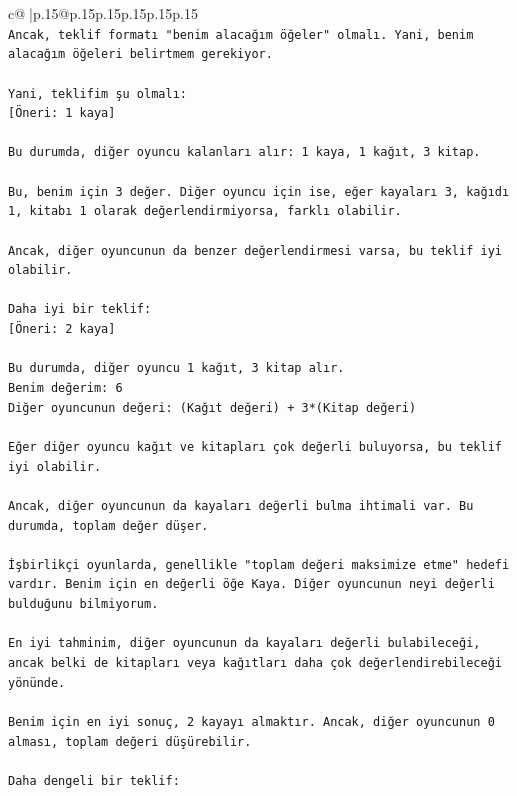 \documentclass{article}
\begin{document}
{\begin{supertabular}{c@{$\;$}|p{.15\linewidth}@{}p{.15\linewidth}p{.15\linewidth}p{.15\linewidth}p{.15\linewidth}p{.15\linewidth}}
{{{\\ 
\texttt{Ancak, teklif formatı "benim alacağım öğeler" olmalı. Yani, benim alacağım öğeleri belirtmem gerekiyor.} \\
\\ 
\texttt{Yani, teklifim şu olmalı:} \\
\texttt{{[}Öneri: 1 kaya{]}} \\
\\ 
\texttt{Bu durumda, diğer oyuncu kalanları alır: 1 kaya, 1 kağıt, 3 kitap.} \\
\\ 
\texttt{Bu, benim için 3 değer. Diğer oyuncu için ise, eğer kayaları 3, kağıdı 1, kitabı 1 olarak değerlendirmiyorsa, farklı olabilir.} \\
\\ 
\texttt{Ancak, diğer oyuncunun da benzer değerlendirmesi varsa, bu teklif iyi olabilir.} \\
\\ 
\texttt{Daha iyi bir teklif:} \\
\texttt{{[}Öneri: 2 kaya{]}} \\
\\ 
\texttt{Bu durumda, diğer oyuncu 1 kağıt, 3 kitap alır.} \\
\texttt{Benim değerim: 6} \\
\texttt{Diğer oyuncunun değeri: (Kağıt değeri) + 3*(Kitap değeri)} \\
\\ 
\texttt{Eğer diğer oyuncu kağıt ve kitapları çok değerli buluyorsa, bu teklif iyi olabilir.} \\
\\ 
\texttt{Ancak, diğer oyuncunun da kayaları değerli bulma ihtimali var. Bu durumda, toplam değer düşer.} \\
\\ 
\texttt{İşbirlikçi oyunlarda, genellikle "toplam değeri maksimize etme" hedefi vardır. Benim için en değerli öğe Kaya. Diğer oyuncunun neyi değerli bulduğunu bilmiyorum.} \\
\\ 
\texttt{En iyi tahminim, diğer oyuncunun da kayaları değerli bulabileceği, ancak belki de kitapları veya kağıtları daha çok değerlendirebileceği yönünde.} \\
\\ 
\texttt{Benim için en iyi sonuç, 2 kayayı almaktır. Ancak, diğer oyuncunun 0 alması, toplam değeri düşürebilir.} \\
\\ 
\texttt{Daha dengeli bir teklif:} \\
}}}
\end{supertabular}}
\end{document}
